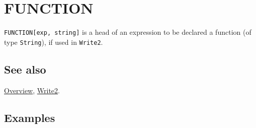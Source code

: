 \documentclass[../FeynCalcManual.tex]{subfiles}
\begin{document}
\hypertarget{function}{
\section{FUNCTION}\label{function}}

\texttt{FUNCTION[\allowbreak{}exp,\ \allowbreak{}string]} is a head of
an expression to be declared a function (of type \texttt{String}), if
used in \texttt{Write2}.

\subsection{See also}

\hyperlink{toc}{Overview}, \hyperlink{write2}{Write2}.

\subsection{Examples}
\end{document}
